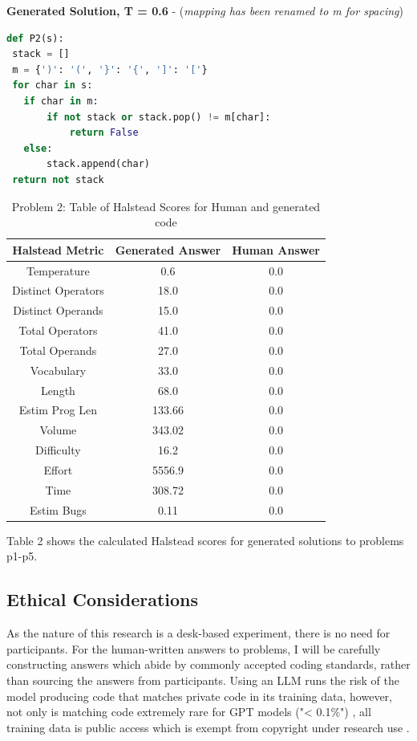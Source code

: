 \documentclass[manuscript,screen,review,sigconf]{acmart}
\begin{document}
\textbf{Generated Solution, T = 0.6} - (\textit{mapping has been renamed to m for spacing})
\begin{lstlisting}[language=Python]
def P2(s):
 stack = []
 m = {')': '(', '}': '{', ']': '['}
 for char in s:
   if char in m:
       if not stack or stack.pop() != m[char]:
           return False
   else:
       stack.append(char)
 return not stack
\end{lstlisting}


\begin{table}[H]
    \centering
    \begin{tabular}{|c|c|c|} \hline
         \textbf{Halstead Metric} & Generated Answer & Human Answer\\
         \hline
         Temperature & 0.6 & 0.0 \\
         Distinct Operators & 18.0 & 0.0\\
         Distinct Operands & 15.0 & 0.0\\
         Total Operators & 41.0 & 0.0\\
         Total Operands & 27.0 & 0.0\\
         Vocabulary & 33.0 & 0.0\\
         Length & 68.0 & 0.0\\
         Estim Prog Len & 133.66 & 0.0 \\
         Volume &  343.02 & 0.0\\
         Difficulty &  16.2 & 0.0\\
         Effort & 5556.9 & 0.0\\
         Time &  308.72 & 0.0\\
         Estim Bugs & 0.11 & 0.0\\
         \hline
    \end{tabular}
    \caption{Problem 2: Table of Halstead Scores for Human and generated code}
    \label{tab:HalsteadMetrics}
\end{table}

Table 2 shows the calculated Halstead scores for generated solutions to problems p1-p5.

\subsection{Ethical Considerations}
As the nature of this research is a desk-based experiment, there is no need for participants. For the human-written answers to problems, I will be carefully constructing answers which abide by commonly accepted coding standards, rather than sourcing the answers from participants. Using an LLM runs the risk of the model producing code that matches private code in its training data, however, not only is matching code extremely rare for GPT models ("< 0.1\%") \cite{CodexRelPaper}, all training data is public access which is exempt from copyright under research use \cite{ExceptionToCopyright}.
\end{document}
